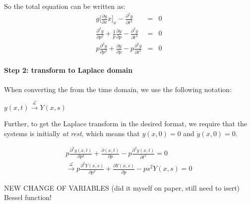 So the total equation can be written as:
\begin{eqnarray}
\label{eq:chaincombination2}
 g \big[\frac{\partial y}{\partial x} x \big]_x - \frac{\partial^2 y}{\partial t^2} &=& 0 \\
  \frac{\partial^2 y}{\partial p^2} + \frac{1}{p} \frac{\partial y}{\partial p} - \frac{\partial^2 y}{\partial t^2} &=& 0 \\
 p \frac{\partial^2 y}{\partial p^2} +
  \frac{\partial y}{\partial p} - p \frac{\partial^2 y}{\partial t^2} &=& 0
\end{eqnarray}

\paragraph{Step 2: transform to Laplace domain}

When converting the from the time domain, we use the following notation:
\begin{center}
$y(x,t) \xrightarrow{\mathcal{L}} Y(x,s)$
\end{center}
Further, to get the Laplace transform in the desired format, we require that the systems is initially \textit{at rest}, which means that $y(x,0)=0$ and $\dot{y}(x,0)=0$.

\begin{equation}
\label{eq:heavychainlaplace}
\begin{aligned}
 p \frac{\partial^2 y(x,t)}{\partial p^2} +
  \frac{\partial (x,t)}{\partial p} - p \frac{\partial^2 y(x,t)}{\partial t^2} = 0 \\
  \xrightarrow{\mathcal{L}}
 p \frac{\partial^2 Y(x,s)}{\partial p^2} +
  \frac{\partial Y(x,s)}{\partial p} - p s^2 Y(x,s) = 0
\end{aligned}
\end{equation}

NEW CHANGE OF VARIABLES (did it myself on paper, still need to isert)\newline
Bessel function!


